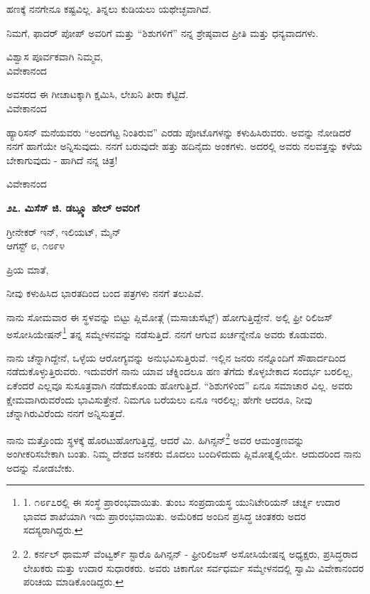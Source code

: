ಹಣಕ್ಕೆ ನನಗೇನೂ ಕಷ್ಟವಿಲ್ಲ. ತಿನ್ನಲು ಕುಡಿಯಲು ಯಥೇಚ್ಛವಾಗಿದೆ.

ನಿಮಗೆ, ಫಾದರ್ ಪೋಪ್ ಅವರಿಗೆ ಮತ್ತು “ಶಿಶುಗಳಿಗೆ” ನನ್ನ ಶ್ರೇಷ್ಠವಾದ ಪ್ರೀತಿ ಮತ್ತು ಧನ್ಯವಾದಗಳು.

\begin{flushright}
ವಿಶ್ವಾಸ ಪೂರ್ವಕವಾಗಿ ನಿಮ್ಮವ,\\ವಿವೇಕಾನಂದ
\end{flushright}

ಅವಸರದ ಈ ಗೀಚಾಟಕ್ಕಾಗಿ ಕ್ಷಮಿಸಿ, ಲೇಖನಿ ತೀರಾ ಕೆಟ್ಟಿದೆ.\\ವಿವೇಕಾನಂದ

ಹ್ಯಾರಿಸನ್ ಮನೆಯವರು “ಅಂದಗೆಟ್ಟ ನಿಂತಿರುವ” ಎರಡು ಪೋಟೊಗಳನ್ನು ಕಳುಹಿಸಿರುವರು. ಅವನ್ನು ನೋಡಿದರೆ ನನಗೆ ಹಾಗೆಯೇ ಅನ್ನಿಸುವುದು. ನನಗೆ ಬರುವುದೇ ಹತ್ತು ಹದಿನೈದು ಅಂಕಗಳು. ಅದರಲ್ಲಿ ಅವರು ನಲವತ್ತನ್ನು ಕಳೆಯ ಬೇಕಾಗುವುದು - ಹಾಗಿದೆ ನನ್ನ ಚಿತ್ರ!

\begin{flushright}
ವಿವೇಕಾನಂದ
\end{flushright}

\begin{center}
\textbf{೨೭. ಮಿಸೆಸ್ ಜಿ. ಡಬ್ಲ್ಯೂ ಹೇಲ್ ಅವರಿಗೆ}
\end{center}

\begin{flushright}
ಗ್ರೀನೇಕರ್ ಇನ್, ಇಲಿಯಟ್, ಮೈನ್\\ಆಗಸ್ಟ್ ೮, ೧೮೯೪
\end{flushright}

ಪ್ರಿಯ ಮಾತೆ,

ನೀವು ಕಳುಹಿಸಿದ ಭಾರತದಿಂದ ಬಂದ ಪತ್ರಗಳು ನನಗೆ ತಲುಪಿವೆ.

ನಾನು ಸೋಮವಾರ ಈ ಸ್ಥಳವನ್ನು ಬಿಟ್ಟು ಪ್ಲಿಮೋತ್ಗೆ (ಮಸಾಚುಸೆಟ್ಸ್) ಹೋಗುತ್ತಿದ್ದೇನೆ. ಅಲ್ಲಿ ಫ್ರೀ ರಿಲಿಜಸ್ ಅಸೋಸಿಯೇಷನ್\footnote{1. ೧೮೯೭ರಲ್ಲಿ ಈ ಸಂಸ್ಥೆ ಪ್ರಾರಂಭವಾಯಿತು. ತುಂಬ ಸಂಪ್ರದಾಯಸ್ಥ ಯುನಿಟೇರಿಯನ್ ಚರ್ಚ್ನ ಉದಾರ ಭಾವದ ಶಾಖೆಯಾಗಿ ಇದು ಪ್ರಾರಂಭವಾಯಿತು. ಅಮೆರಿಕದ ಅಂದಿನ ಪ್ರಸಿದ್ಧ ಚಿಂತಕರು ಅದರ ಸದಸ್ಯರಾಗಿದ್ದರು.} ತನ್ನ ಸಮ್ಮೇಳನವನ್ನು ನಡೆಸುತ್ತಿದೆ. ನನಗೆ ಆಗುವ ಖರ್ಚನ್ನೇನೊ ಅವರು ಕೊಡುವರು.

ನಾನು ಚೆನ್ನಾಗಿದ್ದೇನೆ, ಒಳ್ಳೆಯ ಆರೋಗ್ಯವನ್ನು ಅನುಭವಿಸುತ್ತಿರುವೆ. ಇಲ್ಲಿನ ಜನರು ನನ್ನೊಂದಿಗೆ ಸೌಹಾರ್ದದಿಂದ ನಡೆದುಕೊಳ್ಳುತ್ತಿರುವರು. ಇದುವರೆಗೆ ನಾನು ಯಾವ ಚೆಕ್ನಿಂದಲೂ ಹಣ ತೆಗೆದು ಕೊಳ್ಳಬೇಕಾದ ಸಂದರ್ಭ ಬರಲಿಲ್ಲ, ಏಕೆಂದರೆ ಎಲ್ಲವೂ ಸುಸೂತ್ರವಾಗಿ ನಡೆದುಕೊಂಡು ಹೋಗುತ್ತಿದೆ. “ಶಿಶುಗಳಿಂದ” ಏನೂ ಸಮಾಚಾರ ವಿಲ್ಲ. ಅವರು ಕ್ಷೇಮವಾಗಿರುವರೆಂದು ಭಾವಿಸುತ್ತೇನೆ. ನಿಮಗೂ ಬರೆಯಲು ಏನೂ ಇರಲಿಲ್ಲ; ಹೇಗೇ ಆದರೂ, ನೀವು ಚೆನ್ನಾಗಿರುವಿರೆಂದು ನನಗೆ ಅನ್ನಿಸುತ್ತದೆ.

ನಾನು ಮತ್ತೊಂದು ಸ್ಥಳಕ್ಕೆ ಹೊರಟುಹೋಗುತ್ತಿದ್ದೆ, ಆದರೆ ಮಿ. ಹಿಗಿನ್ಸನ್\footnote{2. ಕರ್ನಲ್ ಥಾಮಸ್ ವೆಂಟ್ವರ್ಕ್ ಸ್ಟಾರೊ ಹಿಗಿನ್ಸನ್  - ಫ್ರೀರಿಲಿಜಸ್ ಅಸೋಸಿಯೇಷನ್ನ ಅಧ್ಯಕ್ಷರು, ಪ್ರಸಿದ್ಧರಾದ ಲೇಖಕರು ಮತ್ತು ಉದಾರ ಸುಧಾರಕರು. ಅವರು ಚಿಕಾಗೋ ಸರ್ವಧರ್ಮ ಸಮ್ಮೇಳನದಲ್ಲಿ ಸ್ವಾಮಿ ವಿವೇಕಾನಂದರ ಪರಿಚಯ ಮಾಡಿಕೊಂಡಿದ್ದರು.} ಅವರ ಆಮಂತ್ರಣವನ್ನು ಅಂಗೀಕರಿಸಬೇಕಾಗಿ ಬಂತು. ನಿಮ್ಮ ದೇಶದ ಜನಕರು ಮೊದಲು ಬಂದಿಳಿದುದು ಪ್ಲಿಮೋತ್ನಲ್ಲಿಯೇ. ಆದುದರಿಂದ ನಾನು ಅದನ್ನು ನೋಡಬೇಕು.

